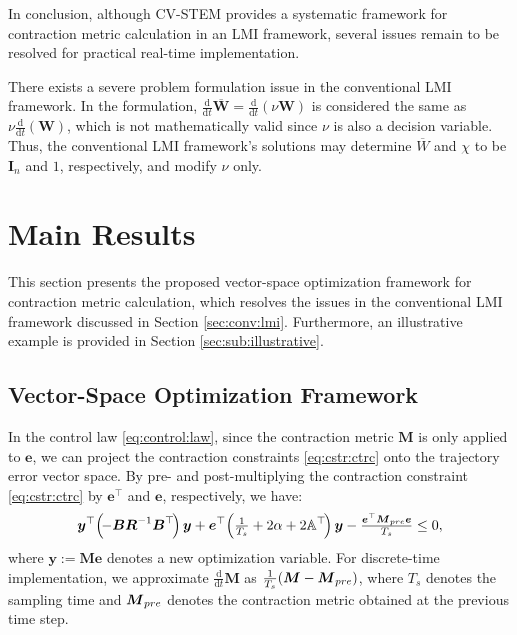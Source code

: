 \documentclass{ifacconf}
\newcommand*{\mv}[1]{\boldsymbol{#1}} %
\newcommand*{\mm}[1]{\boldsymbol{#1}} %
\newcommand\der{\mathrm d}
\newcommand*{\ddtt}{
   \tfrac{\der}{\der t}
}
\begin{document}
In conclusion, although CV-STEM provides a systematic framework for contraction metric calculation in an LMI framework, several issues remain to be resolved for practical real-time implementation.

\begin{rem} \label{rem:scale:invariance}
   There exists a severe problem formulation issue in the conventional LMI framework.
   In the formulation, $\ddtt\overline{\mm{W}}=\ddtt(\nu\mm{W})$ is considered the same as $\nu\ddtt(\mm{W})$, which is not mathematically valid since $\nu$ is also a decision variable.
   Thus, the conventional LMI framework's solutions may determine $\overline{W}$ and $\chi$ to be $\mm{I}_n$ and $1$, respectively, and modify $\nu$ only.
\end{rem}

\section{Main Results} \label{sec:main:results}

This section presents the proposed vector-space optimization framework for contraction metric calculation, which resolves the issues in the conventional LMI framework discussed in Section \ref{sec:conv:lmi}.
Furthermore, an illustrative example is provided in Section \ref{sec:sub:illustrative}.

\subsection{Vector-Space Optimization Framework}

In the control law \eqref{eq:control:law}, since the contraction metric $\mm{M}$ is only applied to $\mv{e}$, we can project the contraction constraints \eqref{eq:cstr:ctrc} onto the trajectory error vector space.
By pre- and post-multiplying the contraction constraint \eqref{eq:cstr:ctrc} by $\mv{e}^\top$ and $\mv{e}$, respectively, we have:
\begin{equation} \label{eq:cstr:ctrc:proj}
   \mv{y}^\top 
   \!
   \left(
   \!
      -\mm{B} \mm{R}^{-1} \mm{B}^\top
   \!
   \right)
   \mv{y}
   +
   \mv{e}^\top
   \!
   \left(
      \tfrac{1}{T_s}+2\alpha
      +
      2\mathbb{A}^\top
   \!
   \right)
   \mv{y}
   -
   \tfrac{\mv{e}^\top \mm{M}_{\rm{pre}} \mv{e}}{T_s}
   \le 0
   ,
\end{equation}
where $\mv{y}:=\mm{M}\mv{e}$ denotes a new optimization variable.
For discrete-time implementation, we approximate $\ddtt\mm{M}$ as $\tfrac{1}{T_s}(\mm{M}-\mm{M}_{\rm{pre}})$, where $T_s$ denotes the sampling time and $\mm{M}_{\rm{pre}}$ denotes the contraction metric obtained at the previous time step.
\end{document}
